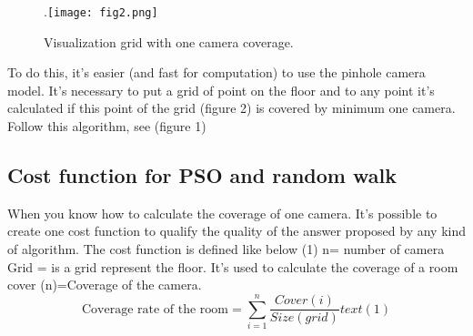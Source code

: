 \begin{figure}
  \centering
  \hspace*{\fill}
	.\texttt{[image: fig2.png]}
  \hspace*{\fill}
  \caption{%
	 Visualization grid with one camera coverage.}
  \label{fig:422}
\end{figure}

To do this, it’s easier (and fast for computation) to use the pinhole camera model.  It’s necessary to put a grid of point on the floor and to any point it’s calculated if this point of the grid (figure 2) is covered by minimum one camera. Follow this algorithm, see (figure 1)


\subsection{Cost function for PSO and random walk }

When you know how to calculate the coverage of one camera. It’s possible to create one cost function to qualify the quality of the answer proposed by any kind of algorithm. 
The cost function is defined like below (1)
n= number of camera 
Grid = is a grid represent the floor. It’s used to calculate the coverage of a room\\
cover (n)=Coverage of the camera.\\
 $$ \text{Coverage rate of the room}= \sum\limits_{i=1}^{n}\frac{Cover(i)}{Size(grid)}text{(1)}$$



